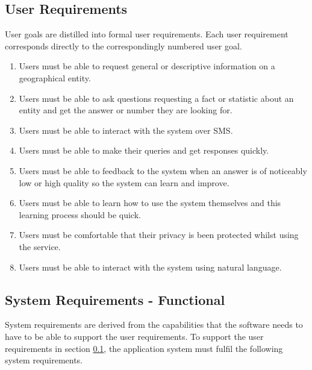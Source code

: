 \documentclass[authoryearcitations]{UoYCSproject}
\begin{document}
\subsection{User Requirements}
\label{subsubsec:userRequirements}
User goals are distilled into formal user requirements.  Each user requirement corresponds directly to the correspondingly numbered user goal.
\begin{enumerate}
  \item Users must be able to request general or descriptive information on a geographical entity.
  \item Users must be able to ask questions requesting a fact or statistic about an entity and get the answer or number they are looking for.
  \item Users must be able to interact with the system over SMS.
  \item Users must be able to make their queries and get responses quickly.
  \item Users must be able to feedback to the system when an answer is of noticeably low or high quality so the system can learn and improve.
  \item Users must be able to learn how to use the system themselves and this learning process should be quick.
  \item Users must be comfortable that their privacy is been protected whilst using the service.
  \item \label{requirement:userReqNaturalLanguage} Users must be able to interact with the system using natural language.
\end{enumerate}

\subsection{System Requirements - Functional}
\label{subsubsec:systemRequirementsFunctional}

System requirements are derived from the capabilities that the software needs to have to be able to support the user requirements. To support the user requirements in section \ref{subsubsec:userRequirements}, the application system must fulfil the following system requirements.
\end{document}
